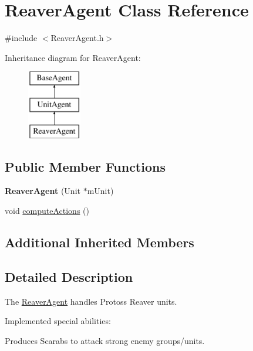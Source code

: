 \hypertarget{class_reaver_agent}{\section{Reaver\-Agent Class Reference}
\label{class_reaver_agent}
}


{\ttfamily \#include $<$Reaver\-Agent.\-h$>$}

Inheritance diagram for Reaver\-Agent\-:\begin{figure}[H]
\begin{center}
\leavevmode
\includegraphics[height=3.000000cm]{class_reaver_agent}
\end{center}
\end{figure}
\subsection*{Public Member Functions}
\begin{DoxyCompactItemize}
\item 
\hypertarget{class_reaver_agent_a202a0e8d9a2a00a2733f8c01d5534e5c}{{\bfseries Reaver\-Agent} (Unit $\ast$m\-Unit)}\label{class_reaver_agent_a202a0e8d9a2a00a2733f8c01d5534e5c}

\item 
void \hyperlink{class_reaver_agent_afcfdbb6e0de0de7dca7a5426852c71e5}{compute\-Actions} ()
\end{DoxyCompactItemize}
\subsection*{Additional Inherited Members}


\subsection{Detailed Description}
The \hyperlink{class_reaver_agent}{Reaver\-Agent} handles Protoss Reaver units.

Implemented special abilities\-:
\begin{DoxyItemize}
\item Produces Scarabs to attack strong enemy groups/units.
\end{DoxyItemize}

